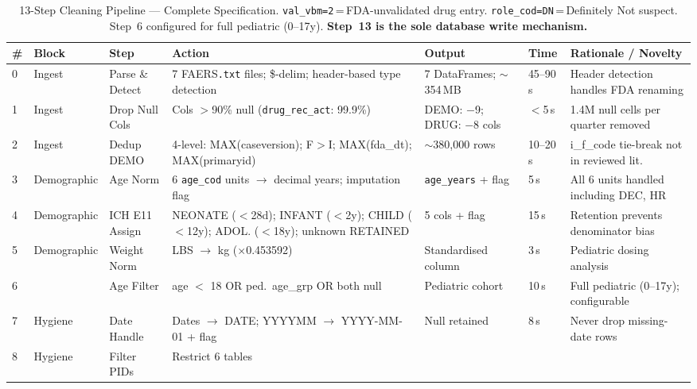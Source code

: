 \documentclass[10pt,twocolumn]{article}
\renewcommand{\arraystretch}{1.28}
\newcommand{\FAERS}{\textsf{FAERS}\xspace}
\begin{document}
\begin{table}[!t]
\caption{13-Step Cleaning Pipeline --- Complete Specification.
\texttt{val\_vbm=2}\,=\,FDA-unvalidated drug entry.
\texttt{role\_cod=DN}\,=\,Definitely Not suspect.
Step~6 configured for full pediatric (0--17y).
\textbf{Step~13 is the sole database write mechanism.}}
\label{tab:pipeline}
\centering\small\setlength{\tabcolsep}{3.5pt}
\renewcommand{\arraystretch}{1.28}
\begin{tabular}{|>{\centering\arraybackslash}p{0.4cm}|>{\centering\arraybackslash}p{1.5cm}|p{1.7cm}|p{4.6cm}|p{2.3cm}|p{0.9cm}|p{3.6cm}|}
\hline
\rowcolor{tableHead}
\color{white}\textbf{\#}&\color{white}\textbf{Block}&\color{white}\textbf{Step}&
\color{white}\textbf{Action}&
\color{white}\textbf{Output}&
\color{white}\textbf{Time}&
\color{white}\textbf{Rationale / Novelty}\\
\hline
\rowcolor{rowA}0&Ingest&Parse \& Detect&7 \FAERS \texttt{.txt} files;
\$-delim; header-based type detection&
7 DataFrames; $\sim$354\,MB&45--90\,s&
Header detection handles FDA renaming\\
\hline
\rowcolor{rowB}1&Ingest&Drop Null Cols&Cols $>$90\% null
(\texttt{drug\_rec\_act}: 99.9\%)&
DEMO: $-$9; DRUG: $-$8 cols&$<$5\,s&
1.4M null cells per quarter removed\\
\hline
\rowcolor{rowA}2&Ingest&Dedup DEMO&4-level: MAX(caseversion);
F$>$I; MAX(fda\_dt); MAX(primaryid)&
$\sim$380,000 rows&10--20\,s&
i\_f\_code tie-break not in reviewed lit.\\
\hline
\rowcolor{rowB}3&Demographic&Age Norm&6 \texttt{age\_cod} units
$\to$ decimal years; imputation flag&
\texttt{age\_years} + flag&5\,s&
All 6 units handled including DEC, HR\\
\hline
\rowcolor{rowA}4&Demographic&ICH E11 Assign&NEONATE ($<$28d);
INFANT ($<$2y); CHILD ($<$12y); ADOL. ($<$18y);
unknown RETAINED&
5 cols + flag&15\,s&
Retention prevents denominator bias\\
\hline
\rowcolor{rowB}5&Demographic&Weight Norm&LBS $\to$ kg
($\times$0.453592)&
Standardised column&3\,s&
Pediatric dosing analysis\\
\hline
\rowcolor{rowA}6&6&Age Filter&age $<$ 18 OR
ped.\ age\_grp OR both null&
Pediatric cohort&10\,s&
Full pediatric (0--17y); configurable\\
\hline
\rowcolor{rowB}7&Hygiene&Date Handle&Dates $\to$ DATE;
YYYYMM $\to$ YYYY-MM-01 + flag&
Null retained&8\,s&
Never drop missing-date rows\\
\hline
\rowcolor{rowA}8&Hygiene&Filter PIDs&Restrict 6 tables

\end{tabular}
\end{table}
\end{document}
